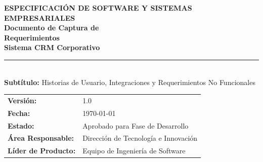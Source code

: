 \documentclass[11pt,a4paper]{article}
\begin{document}
\hypersetup{pageanchor=false}
\begin{titlepage}
    \pagecolor{white}
    
    \vspace*{1.5cm}
    \begin{flushleft}
        \hspace*{1.2cm}
        \begin{minipage}{0.88\textwidth}
            {\large\sffamily\textcolor{SecondarySteel}{\textbf{ESPECIFICACIÓN DE SOFTWARE Y SISTEMAS EMPRESARIALES}}}\\[0.4cm]
            {\Huge\sffamily\bfseries\textcolor{PrimaryNavy}{Documento de Captura de}}\\[0.2cm]
            {\Huge\sffamily\bfseries\textcolor{PrimaryNavy}{Requerimientos}}\\[0.4cm]
            {\LARGE\sffamily\bfseries\textcolor{SecondarySteel}{Sistema CRM Corporativo}}\\[0.8cm]
            
            \noindent\textcolor{SecondarySteel}{\rule{\linewidth}{1.5pt}}\\[0.8cm]
            
            {\large\sffamily\textcolor{DarkText}{\textbf{Subtítulo:}} Historias de Usuario, Integraciones y Requerimientos No Funcionales}\\[1.5cm]
            
            \begin{tcolorbox}[
                colback=BgSoftGray,
                colframe=BorderGray,
                arc=2mm,
                boxrule=1pt,
                left=15pt,
                right=15pt,
                top=12pt,
                bottom=12pt
            ]
                \sffamily
                \begin{tabular}{ll}
                    \textbf{\textcolor{PrimaryNavy}{Versión:}} & 1.0 \\[4pt]
                    \textbf{\textcolor{PrimaryNavy}{Fecha:}} & \today \\[4pt]
                    \textbf{\textcolor{PrimaryNavy}{Estado:}} & Aprobado para Fase de Desarrollo \\[4pt]
                    \textbf{\textcolor{PrimaryNavy}{Área Responsable:}} & Dirección de Tecnología e Innovación \\[4pt]
                    \textbf{\textcolor{PrimaryNavy}{Líder de Producto:}} & Equipo de Ingeniería de Software
                \end{tabular}
            \end{tcolorbox}
            

\end{minipage}
\end{flushleft}
\end{titlepage}
\end{document}
